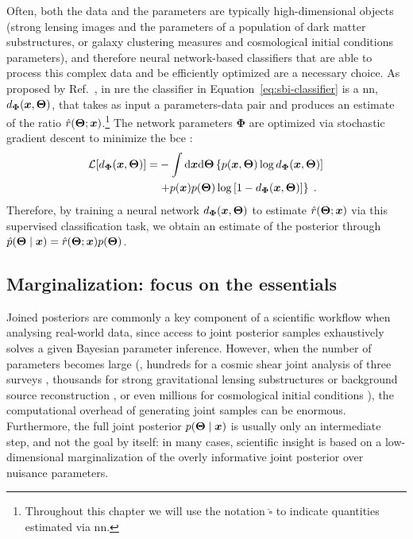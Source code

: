 Often, both the data and the parameters are typically high-dimensional objects (\eg strong lensing images and the parameters of a population of dark matter substructures, or galaxy clustering measures and  cosmological initial conditions parameters), and therefore neural network-based classifiers that are able to process this complex data and be efficiently optimized are a necessary choice.
As proposed by Ref.~\cite{Hermans:2019ioj}, in \gls*{nre} the classifier in Equation~\eqref{eq:sbi-classifier} is a \gls*{nn},  $d_{\bm{\Phi}}(\bm{x}, \bm{\Theta})$, that takes as input a parameters-data pair and produces an estimate of the ratio $\hat{r}(\bm{\Theta};\bm{x})$.\footnote{Throughout this chapter we will use the notation $\hat{\square}$ to indicate quantities estimated via \gls*{nn}.} 
The network parameters ${\bm{\Phi}}$ are optimized via stochastic gradient descent  \cite{Murphy:book, bottou:nips, kingma2014adam} to minimize the \gls*{bce} \cite{mao2023cross}:
\begin{equation}\label{eq:sbi-bce}
\begin{split}
    \mathcal{L}[d_{\bm{\Phi}}(\bm{x}, \bm{\Theta})] = &-\int \dd \bm{x}  \dd\bm{\Theta} \left\{ p(\bm{x}, \bm{\Theta}) \log d_{\bm{\Phi}}(\bm{x}, \bm{\Theta}) ] \right. \\
    & \left. + p(\bm{x}) p(\bm{\Theta}) \log\left[ 1 - d_{\bm{\Phi}}(\bm{x}, \bm{\Theta}) \right] \right\}\; .
\end{split}
\end{equation}
Therefore, by training a neural network $d_{\bm{\Phi}}(\bm{x}, \bm{\Theta})$ to estimate $\hat{r}(\bm{\Theta}; \bm{x})$ via this supervised classification task, we obtain an estimate of the posterior through $\hat{p}(\bm{\Theta} \mid \bm{x}) = \hat{r}(\bm{\Theta}; \bm{x}) p(\bm{\Theta})$. 



\subsection{Marginalization: focus on the essentials} \label{subsec:tmnre-m} %

Joined posteriors are commonly a key component of a scientific workflow when analysing real-world data, since access to joint posterior samples exhaustively solves a given Bayesian parameter inference. However, when the number of parameters becomes large (\eg, hundreds for a cosmic shear joint analysis of three surveys \cite{Piras:2024dml}, thousands for strong gravitational lensing substructures \cite{Montel:2022fhv, Coogan:2022cky} or background source reconstruction \cite{Karchev:2021fro}, or even millions for cosmological initial conditions \cite{Jasche:2012kq, List:2023aa}), the computational overhead of generating joint samples can be enormous. Furthermore, the full joint posterior $p(\bm{\Theta} \mid \bm{x})$ is usually only an intermediate step, and not the goal by itself: in many cases, scientific insight is based on a low-dimensional marginalization of the overly informative joint posterior over nuisance parameters.

